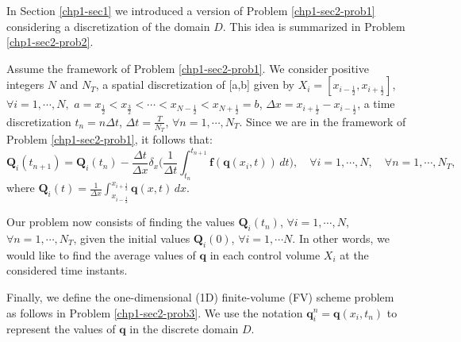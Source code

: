 In Section \ref{chp1-sec1} we introduced a version of Problem \ref{chp1-sec2-prob1}
considering a discretization of the domain $D$. 
This idea is summarized in Problem \ref{chp1-sec2-prob2}.
\begin{prob}
        \label{chp1-sec2-prob2}
	Assume the framework of Problem \ref{chp1-sec2-prob1}.
        We consider positive integers $N$ and $N_T$, a spatial discretization of [a,b] given by
        $X_i = [x_{i-\frac{1}{2}}, x_{i+\frac{1}{2}}]$,
        $\forall i = 1, \cdots, N,$ 
	$a = x_{\frac{1}{2}} < x_{\frac{3}{2}} < \cdots < x_{N-\frac{1}{2}} < x_{N+\frac{1}{2}} = b$,
	$\Delta x = x_{i+\frac{1}{2}}-x_{i-\frac{1}{2}}$,
	a time discretization
        $t_n = n\Delta t$, $\Delta t = \frac{T}{N_T}$, $\forall n = 1, \cdots, N_T$.
	Since we are in the framework of Problem \ref{chp1-sec2-prob1}, it follows that:
        \begin{equation*}
                \mathbf{Q}_i(t_{n+1}) =  \mathbf{Q}_i(t_n) -
                \frac{\Delta t}{\Delta x} \delta _x\bigg( \frac{1}{\Delta t}\int_{t_n}^{t_{n+1}}
                \mathbf{f}(\mathbf{q}(x_{i}, t)) \,dt \bigg),
                \quad \forall i = 1, \cdots, N,
                \quad \forall n = 1, \cdots, N_T,
        \end{equation*}
        where $\mathbf{Q}_i(t) = \frac{1}{\Delta x}
        \int_{x_{i-\frac{1}{2}}}^{x_{i+\frac{1}{2}}} \mathbf{q}(x,t) \,dx$.
	
	Our problem now consists of finding the values $\mathbf{Q}_i(t_{n})$, 
	$\forall i = 1, \cdots, N$, $\forall n = 1, \cdots, N_T$,
	given the initial values $\mathbf{Q}_i(0)$, $\forall i = 1, \cdots N$.
	In other words, we would like to find the average values of $\mathbf{q}$
	in each control volume $X_i$ at the considered time instants.
\end{prob}

Finally, we define the one-dimensional (1D) finite-volume (FV)
scheme problem as follows in Problem \ref{chp1-sec2-prob3}.
We use the notation $\mathbf{q}^n_{i} = \mathbf{q}(x_i, t_n)$
to represent the values of $\mathbf{q}$ in the discrete domain $D$.


